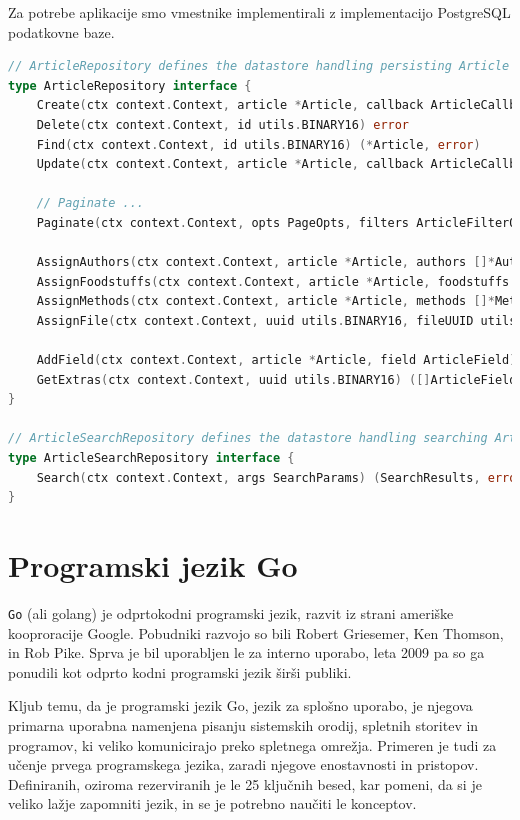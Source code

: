 \documentclass[a4paper, 12pt]{book}
\begin{document}
Za potrebe aplikacije smo vmestnike implementirali z implementacijo PostgreSQL podatkovne baze. 
\begin{lstlisting}[language=go, style=mystyle,caption={Vmestnik, ki definira repozitorij za publikacije},label=lst:article-repository]
// ArticleRepository defines the datastore handling persisting Article records.
type ArticleRepository interface {
	Create(ctx context.Context, article *Article, callback ArticleCallbackFn) (*Article, error)
	Delete(ctx context.Context, id utils.BINARY16) error
	Find(ctx context.Context, id utils.BINARY16) (*Article, error)
	Update(ctx context.Context, article *Article, callback ArticleCallbackFn) (*Article, error)

	// Paginate ...
	Paginate(ctx context.Context, opts PageOpts, filters ArticleFilterOpts) ([]Article, error)

	AssignAuthors(ctx context.Context, article *Article, authors []*Author, callback ArticleCallbackFn) error
	AssignFoodstuffs(ctx context.Context, article *Article, foodstuffs []*Foodstuff, callback ArticleCallbackFn) error
	AssignMethods(ctx context.Context, article *Article, methods []*Method, callback ArticleCallbackFn) error
	AssignFile(ctx context.Context, uuid utils.BINARY16, fileUUID utils.BINARY16) error

	AddField(ctx context.Context, article *Article, field ArticleField) error
	GetExtras(ctx context.Context, uuid utils.BINARY16) ([]ArticleField, error)
}

// ArticleSearchRepository defines the datastore handling searching Article records.
type ArticleSearchRepository interface {
	Search(ctx context.Context, args SearchParams) (SearchResults, error)
}
\end{lstlisting}

\section{Programski jezik Go}

\verb=Go= (ali golang) je odprtokodni programski jezik, razvit iz strani ameriške kooproracije Google. Pobudniki razvojo so bili Robert Griesemer, Ken Thomson, in Rob Pike. Sprva je bil uporabljen le za interno uporabo, leta 2009 pa so ga ponudili kot odprto kodni programski jezik širši publiki. 
 
Kljub temu, da je programski jezik Go, jezik za splošno uporabo, je njegova primarna uporabna namenjena pisanju sistemskih orodij, spletnih storitev in programov, ki veliko komunicirajo preko  spletnega omrežja. Primeren je tudi za učenje prvega programskega jezika, zaradi njegove enostavnosti in pristopov. Definiranih, oziroma rezerviranih je le 25 ključnih besed, kar pomeni, da si je veliko lažje zapomniti jezik, in se je potrebno naučiti le konceptov.
\end{document}
